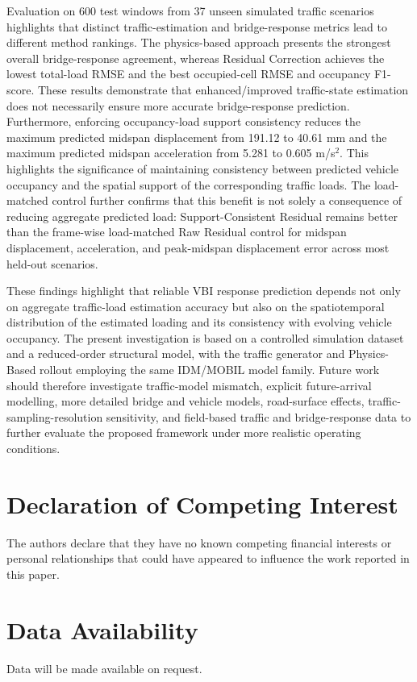 \documentclass[journal]{IEEEtran}
\begin{document}
Evaluation on 600 test windows from 37 unseen simulated traffic scenarios highlights that distinct traffic-estimation and bridge-response metrics lead to different method rankings. The physics-based approach presents the strongest overall bridge-response agreement, whereas Residual Correction achieves the lowest total-load RMSE and the best occupied-cell RMSE and occupancy F1-score. These results demonstrate that enhanced/improved traffic-state estimation does not necessarily ensure more accurate bridge-response prediction. Furthermore, enforcing occupancy-load support consistency reduces the maximum predicted midspan displacement from 191.12 to 40.61 mm and the maximum predicted midspan acceleration from 5.281 to 0.605 m/s$^2$. This highlights the significance of maintaining consistency between predicted vehicle occupancy and the spatial support of the corresponding traffic loads. {\color{blue}The load-matched control further confirms that this benefit is not solely a consequence of reducing aggregate predicted load: Support-Consistent Residual remains better than the frame-wise load-matched Raw Residual control for midspan displacement, acceleration, and peak-midspan displacement error across most held-out scenarios.}

These findings highlight that reliable VBI response prediction depends not only on aggregate traffic-load estimation accuracy but also on the spatiotemporal distribution of the estimated loading and its consistency with evolving vehicle occupancy. The present investigation is based on a controlled simulation dataset and a reduced-order structural model, with the traffic generator and Physics-Based rollout employing the same IDM/MOBIL model family. {\color{blue}Future work should therefore investigate traffic-model mismatch, explicit future-arrival modelling, more detailed bridge and vehicle models, road-surface effects, traffic-sampling-resolution sensitivity, and field-based traffic and bridge-response data to further evaluate the proposed framework under more realistic operating conditions.}

\section*{Declaration of Competing Interest}

The authors declare that they have no known competing financial interests or personal relationships that could have appeared to influence the work reported in this paper.

\section*{Data Availability}

Data will be made available on request.

\FloatBarrier



\end{document}
